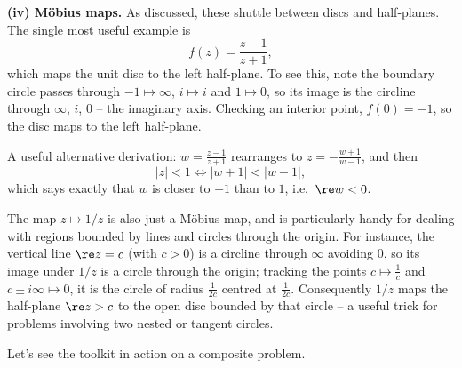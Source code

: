 \textbf{(iv) M\"obius maps.} As discussed, these shuttle between discs and half-planes. The single most useful example is
$$
f(z) = \frac{z - 1}{z + 1},
$$
which maps the unit disc to the left half-plane. To see this, note the boundary circle passes through $-1 \mapsto \infty$, $i \mapsto i$ and $1 \mapsto 0$, so its image is the circline through $\infty$, $i$, $0$ -- the imaginary axis. Checking an interior point, $f(0) = -1$, so the disc maps to the left half-plane.
\begin{center}
\end{center}
A useful alternative derivation: $w = \frac{z-1}{z+1}$ rearranges to $z = -\frac{w+1}{w-1}$, and then
$$
|z| < 1 \iff |w + 1| < |w - 1|,
$$
which says exactly that $w$ is closer to $-1$ than to $1$, i.e.\ $\re w < 0$.

The map $z \mapsto 1/z$ is also just a M\"obius map, and is particularly handy for dealing with regions bounded by lines and circles through the origin. For instance, the vertical line $\re z = c$ (with $c > 0$) is a circline through $\infty$ avoiding $0$, so its image under $1/z$ is a circle through the origin; tracking the points $c \mapsto \frac 1c$ and $c \pm i\infty \mapsto 0$, it is the circle of radius $\frac{1}{2c}$ centred at $\frac{1}{2c}$. Consequently $1/z$ maps the half-plane $\re z > c$ to the open disc bounded by that circle -- a useful trick for problems involving two nested or tangent circles.

Let's see the toolkit in action on a composite problem.

